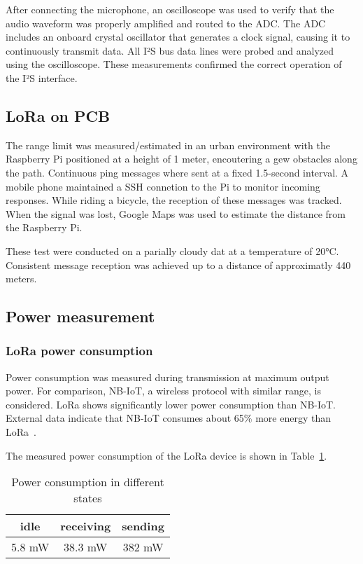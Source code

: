\documentclass[conference]{IEEEtran}
\begin{document}
After connecting the microphone, an oscilloscope was used to verify that the audio waveform was properly amplified and routed to the ADC.
The ADC includes an onboard crystal oscillator that generates a clock signal, causing it to continuously transmit data.
All I²S bus data lines were probed and analyzed using the oscilloscope.
These measurements confirmed the correct operation of the I²S interface.

\subsection{LoRa on PCB}

The range limit was measured/estimated in an urban environment with the Raspberry Pi positioned at a height of 1 meter, encoutering a gew obstacles along the path. Continuous ping messages where sent at a fixed 1.5-second interval. A mobile phone maintained a SSH connetion to the Pi to monitor incoming responses. While riding a bicycle, the reception of these messages was tracked. When the signal was lost, Google Maps was used to estimate the distance from the Raspberry Pi. 

These test were conducted on a parially cloudy dat at a temperature of 20°C. Consistent message reception was achieved up to a distance of approximatly 440 meters.

\subsection{Power measurement}

\subsubsection{LoRa power consumption}

Power consumption was measured during transmission at maximum output power.  
For comparison, NB-IoT, a wireless protocol with similar range, is considered.  
LoRa shows significantly lower power consumption than NB-IoT.  
External data indicate that NB-IoT consumes about 65\% more energy than LoRa~\cite{Lora-nbiot_paper}.  

The measured power consumption of the LoRa device is shown in Table~\ref{tab:power_consumption}.

\begin{table}[h]
  \centering
  \caption{Power consumption in different states}
\label{tab:power_consumption}
  \begin{tabular}{|c|c|c|}
    \hline
    \textbf{idle} & \textbf{receiving} & \textbf{sending} \\
    \hline
    5.8 mW & 38.3 mW & 382 mW \\
    \hline
  \end{tabular}
\end{table}
\end{document}
